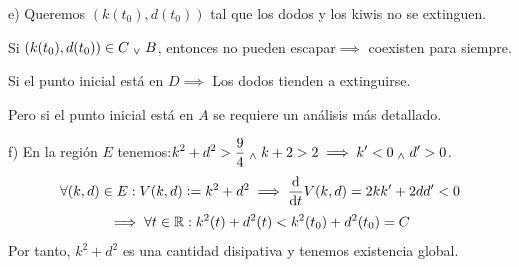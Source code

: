 e) Queremos $\left(k(t_0), d(t_0)\right)$ tal que los dodos y los kiwis no se extinguen.

Si $\left(k(t_0), d(t_0)\right) \in C \; _{\vee} \; B$, entonces no pueden escapar$\implies$ coexisten para siempre.

Si el punto inicial está en $D \implies$ Los dodos tienden a extinguirse.

Pero si el punto inicial está en $A$ se requiere un análisis más detallado.

f) En la región $E$ tenemos:$\displaystyle k^2 + d^2 > \frac{9}{4} \; _{\wedge} \; k+2 > 2 \implies k' < 0 \; _{\wedge} \; d' > 0$.
\[\forall (k, d) \in E : V(k, d) \defeq k^2 + d^2 \implies \odv{}{t}V(k, d) = 2k k' + 2d d' < 0\]
\[\implies \forall t \in \mathbb{R} : k^2(t) + d^2(t) < k^2(t_0) + d^2(t_0) = C\]
Por tanto, $k^2+d^2$ es una cantidad disipativa y tenemos existencia global.